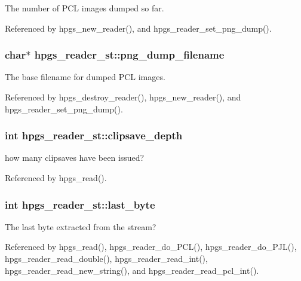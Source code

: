The number of PCL images dumped so far. 

Referenced by hpgs\_\-new\_\-reader(), and hpgs\_\-reader\_\-set\_\-png\_\-dump().
\subsubsection[png\_\-dump\_\-filename]{\setlength{\rightskip}{0pt plus 5cm}char$\ast$ {\bf hpgs\_\-reader\_\-st::png\_\-dump\_\-filename}}\label{structhpgs__reader__st_77896d1ba452a75ae0e26f02a1bd3b50}


The base filename for dumped PCL images. 

Referenced by hpgs\_\-destroy\_\-reader(), hpgs\_\-new\_\-reader(), and hpgs\_\-reader\_\-set\_\-png\_\-dump().
\subsubsection[clipsave\_\-depth]{\setlength{\rightskip}{0pt plus 5cm}int {\bf hpgs\_\-reader\_\-st::clipsave\_\-depth}}\label{structhpgs__reader__st_495296c78e61bc23e1ff853d5d2f4f70}


how many clipsaves have been issued? 

Referenced by hpgs\_\-read().
\subsubsection[last\_\-byte]{\setlength{\rightskip}{0pt plus 5cm}int {\bf hpgs\_\-reader\_\-st::last\_\-byte}}\label{structhpgs__reader__st_a3fce47e898bffa3c3799f252bf2ea82}


The last byte extracted from the stream? 

Referenced by hpgs\_\-read(), hpgs\_\-reader\_\-do\_\-PCL(), hpgs\_\-reader\_\-do\_\-PJL(), hpgs\_\-reader\_\-read\_\-double(), hpgs\_\-reader\_\-read\_\-int(), hpgs\_\-reader\_\-read\_\-new\_\-string(), and hpgs\_\-reader\_\-read\_\-pcl\_\-int().
